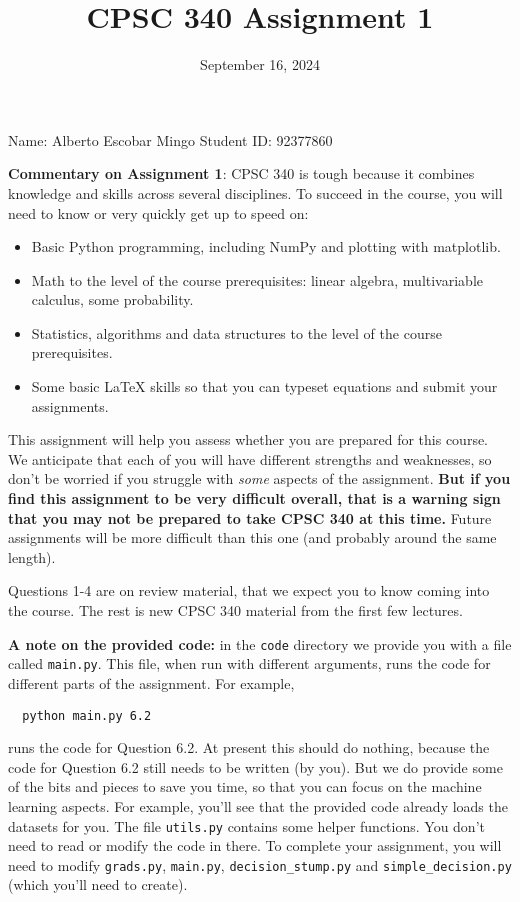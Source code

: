 \documentclass{article}
\begin{document}
  \title{CPSC 340 Assignment 1}


  \date{September 16, 2024}
  \maketitle

Name: Alberto Escobar Mingo
\newline
Student ID: 92377860
\newline

  \textbf{Commentary on Assignment 1}: CPSC 340 is tough because it combines knowledge and skills across several disciplines. To succeed
  in the course, you will need to know or very quickly get up to speed on:
  \begin{itemize}
  \item Basic Python programming, including NumPy and plotting with matplotlib.
  \item Math to the level of the course prerequisites: linear algebra, multivariable calculus, some probability.
  \item Statistics, algorithms and data structures to the level of the course prerequisites.
  \item Some basic LaTeX skills so that you can typeset equations and submit your assignments.
  \end{itemize}

  This assignment will help you assess whether you are prepared for this course. We anticipate that each
  of you will have different strengths and weaknesses, so don't be worried if you struggle with \emph{some} aspects
  of the assignment. \textbf{But if you find this assignment
  to be very difficult overall, that is a warning sign that you may not be prepared to take CPSC 340
  at this time.} Future assignments will be more difficult than this one (and probably around the same length).

  Questions 1-4 are on review material, that we expect you to know coming into the course. The rest is new CPSC 340 material from the first few lectures.

  \textbf{A note on the provided code:} in the \texttt{code} directory we provide you with a file called
  \texttt{main.py}. This file, when run with different arguments, runs the code for different
  parts of the assignment. For example,
  \begin{verbatim}
  python main.py 6.2
  \end{verbatim}
  runs the code for Question 6.2. At present this should do nothing, because the code
  for Question 6.2 still needs to be written (by you). But we do provide some of the bits
  and pieces to save you time, so that you can focus on the machine learning aspects.
  For example, you'll see that the provided code already loads the datasets for you.
  The file \texttt{utils.py} contains some helper functions.
  You don't need to read or modify the code in there.
  To complete your assignment, you will need to modify \texttt{grads.py}, \texttt{main.py}, \texttt{decision\string_stump.py} and \texttt{simple\string_decision.py} (which you'll need to create).
\end{document}
